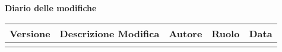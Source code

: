 \newpage
\begin{center}
	\textbf{\Large Diario delle modifiche\\}
	\vspace{2em}
	\begin{longtable}{|l|l|l|l|l|}
		\hline
		\textbf{Versione} & \textbf{Descrizione Modifica} & \textbf{Autore} & \textbf{Ruolo} & \textbf{Data} \\
		\hline
			\modifiche
		\hline
	\end{longtable}
\end{center}

